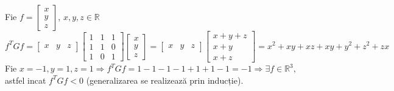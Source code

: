 \documentclass{article}
\begin{document}
\noindent Fie $f =
\begin{bmatrix}
x \\ y \\ z
\end{bmatrix}$, $x, y, z \in \mathbb{R}$\\
$f^T G f =
\begin{bmatrix}
x & y & z
\end{bmatrix}
\begin{bmatrix}
1 & 1 & 1 \\
1 & 1 & 0 \\
1 & 0 & 1
\end{bmatrix}
\begin{bmatrix}
x \\ y \\ z
\end{bmatrix} =
\begin{bmatrix}
x & y & z
\end{bmatrix}
\begin{bmatrix}
x + y + z \\ x + y \\ x + z
\end{bmatrix} =
x^2 + x y + x z + x y + y^2 + z^2 + z x$\\

\noindent Fie $x = -1, y = 1, z = 1 \Rightarrow f^T G f = 1 - 1 - 1 - 1 + 1 + 1 - 1  = -1 \Rightarrow \exists f \in \mathbb{R}^3,$ astfel incat $f^T G f < 0$ (generalizarea se realizează prin inducție).
\end{document}
